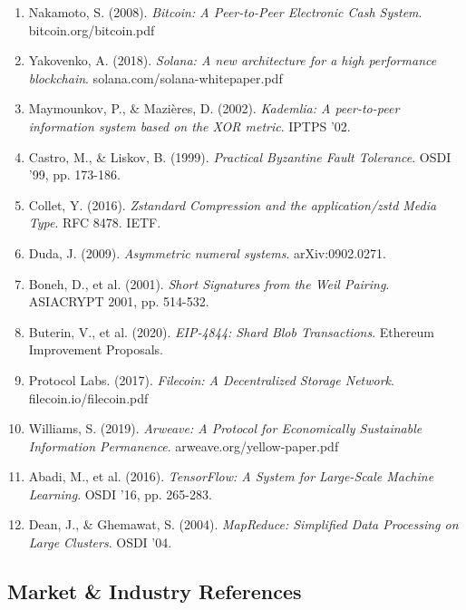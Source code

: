 \documentclass[12pt,a4paper]{article}
\begin{document}
\begin{enumerate}
    \item Nakamoto, S. (2008). \textit{Bitcoin: A Peer-to-Peer Electronic Cash System}. bitcoin.org/bitcoin.pdf

    \item Yakovenko, A. (2018). \textit{Solana: A new architecture for a high performance blockchain}. solana.com/solana-whitepaper.pdf

    \item Maymounkov, P., \& Mazi\`{e}res, D. (2002). \textit{Kademlia: A peer-to-peer information system based on the XOR metric}. IPTPS '02.

    \item Castro, M., \& Liskov, B. (1999). \textit{Practical Byzantine Fault Tolerance}. OSDI '99, pp. 173-186.

    \item Collet, Y. (2016). \textit{Zstandard Compression and the application/zstd Media Type}. RFC 8478. IETF.

    \item Duda, J. (2009). \textit{Asymmetric numeral systems}. arXiv:0902.0271.

    \item Boneh, D., et al. (2001). \textit{Short Signatures from the Weil Pairing}. ASIACRYPT 2001, pp. 514-532.

    \item Buterin, V., et al. (2020). \textit{EIP-4844: Shard Blob Transactions}. Ethereum Improvement Proposals.

    \item Protocol Labs. (2017). \textit{Filecoin: A Decentralized Storage Network}. filecoin.io/filecoin.pdf

    \item Williams, S. (2019). \textit{Arweave: A Protocol for Economically Sustainable Information Permanence}. arweave.org/yellow-paper.pdf

    \item Abadi, M., et al. (2016). \textit{TensorFlow: A System for Large-Scale Machine Learning}. OSDI '16, pp. 265-283.

    \item Dean, J., \& Ghemawat, S. (2004). \textit{MapReduce: Simplified Data Processing on Large Clusters}. OSDI '04.
\end{enumerate}

\subsection*{Market \& Industry References}
\end{document}
